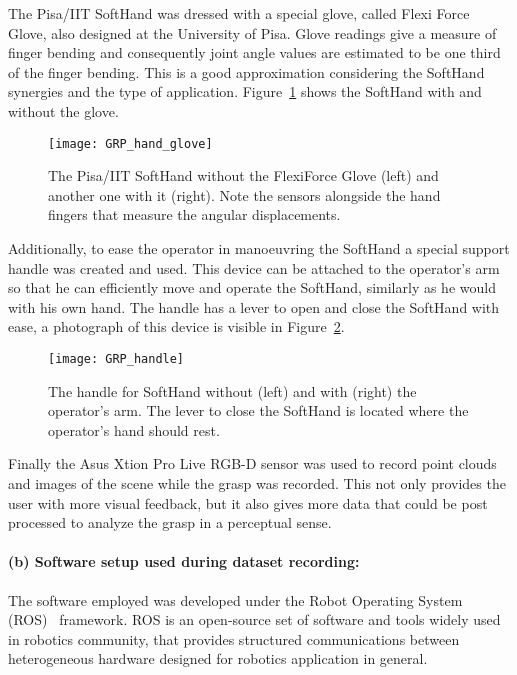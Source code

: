 The Pisa/IIT SoftHand was dressed with a special glove, called Flexi Force Glove, also designed at the University of Pisa.
Glove readings give a measure of finger bending and consequently joint angle values are estimated to be one third of the finger bending. This is a good approximation considering 
the SoftHand synergies and the type of application. Figure~\ref{fig:grasp:hand_glove} shows the SoftHand with and without the glove.
\begin{figure}[tb!]
  \centering
  \texttt{[image: GRP\_hand\_glove]}
  \caption{The Pisa/IIT SoftHand without the FlexiForce Glove (left) and another one with it (right). Note the sensors alongside the hand fingers that measure the angular displacements.}
  \label{fig:grasp:hand_glove}
\end{figure}

Additionally, to ease the operator in manoeuvring the SoftHand a special support handle was created and used. This device can be attached to the operator's arm so that he can efficiently move and operate the SoftHand, similarly as he would with his own hand.
The handle has a lever to open and close the SoftHand with ease, a photograph of this device is visible in Figure~\ref{fig:grasp:handle}.
\begin{figure}[bt]
  \centering
  \texttt{[image: GRP\_handle]}
  \caption{The handle for SoftHand without (left) and with (right) the operator's arm. The lever to close the SoftHand is located where the operator's hand should rest.}
  \label{fig:grasp:handle}
\end{figure}

Finally the Asus Xtion Pro Live RGB-D sensor was used to record point clouds and images of the scene while the grasp was recorded. This not only provides the user with more visual feedback, but it also gives more data that
could be post processed to analyze the grasp in a perceptual sense.
\paragraph{(b) Software setup used during dataset recording:}
The software employed was developed under the Robot Operating System (ROS)~\cite{ROS} framework. ROS is an open-source set of software and tools widely used in robotics community,
that provides structured communications between heterogeneous hardware designed for robotics application in general.

